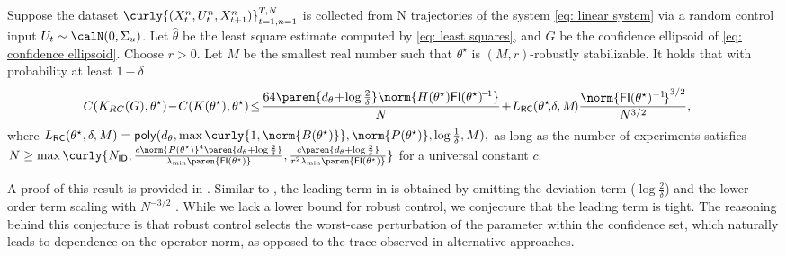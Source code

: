\begin{theorem}
    \label{thm: Robust Control upper bound}
    Suppose the dataset $\curly{(X_t^n, U_t^n, X_{t+1}^n)}_{t=1, n=1}^{T,N}$ is collected from N trajectories of the system \eqref{eq: linear system} via a random control input $U_t \sim \calN(0, \Sigma_u)$. Let $\hat\theta$ be the least square estimate computed by \eqref{eq: least squares}, and $G$ be the confidence ellipsoid of \eqref{eq: confidence ellipsoid}.
    Choose $r > 0$. Let $M$ be the smallest real number such that $\theta^\star$ is $(M, r)$-robustly stabilizable.
    It holds that with probability at least $1-\delta$
    \begin{align}
        &C(K_{RC}(G), \theta^\star)\! -\! C(K(\theta^\star), \theta^\star)\nonumber\!\leq\! \frac{64\paren{d_\theta\!+\!\log\frac{2}{\delta}}\norm{H(\theta^\star)\mathsf{FI}(\theta^\star)^{\!-\!1}}}{N} \!+\! L_{\mathsf{RC}}(\theta^\star\!,\! \delta, M\!)\frac{\norm{\mathsf{FI}(\theta^\star)^{-1}\!}^{3/2}}{N^{3/2}}, %
    \end{align}
    \sloppy where
        $L_{\mathsf{RC}}(\theta^\star, \delta, M) = \mathsf{poly}(d_{\theta}, \max\curly{1, \norm{B(\theta^\star)}}, \norm{P(\theta^\star)}, \log\frac{1}{\delta}, M),$
    as long as the number of experiments satisfies
    $N \geq \max\curly{N_{\mathsf{ID}}, \frac{c\norm{P(\theta^\star)}^4\paren{d_\theta+\log\frac{2}{\delta}}}{\lambda_{\min}\paren{\mathsf{FI}(\theta^\star)}}, \frac{c \paren{d_\theta+\log\frac{2}{\delta}}}{r^2 \lambda_{\min}\paren{\mathsf{FI}(\theta^\star)}}}$ for a universal constant $c$.  %
\end{theorem}
A proof of this result is provided in . Similar to , the leading term in  is obtained by omitting the deviation term ($\log\frac{2}{\delta}$) and the lower-order term scaling with $N^{-3/2}$
 . While we lack a lower bound for robust control, we conjecture that the leading term is tight. The reasoning behind this conjecture is that robust control selects the worst-case perturbation of the parameter within the confidence set, which naturally leads to dependence on the operator norm, as opposed to the trace observed in alternative approaches.

